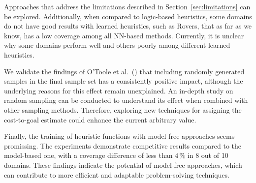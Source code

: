 Approaches that address the limitations described in Section~\ref{sec:limitations} can be explored. Additionally, when compared to logic-based heuristics, some domains do not have good results with learned heuristics, such as Rovers, that as far as we know, has a low coverage among all NN-based methods. Currently, it is unclear why some domains perform well and others poorly among different learned heuristics.

We validate the findings of O'Toole et al.~(\citeyear{OToole/2022}) that including randomly generated samples in the final sample set has a consistently positive impact, although the underlying reasons for this effect remain unexplained. An in-depth study on random sampling can be conducted to understand its effect when combined with other sampling methods. Therefore, exploring new techniques for assigning the cost-to-goal estimate could enhance the current arbitrary value.

Finally, the training of heuristic functions with model-free approaches seems promissing. The experiments demonstrate competitive results compared to the model-based one, with a coverage difference of less than $4\,\%$ in 8 out of 10 domains. These findings indicate the potential of model-free approaches, which can contribute to more efficient and adaptable problem-solving techniques.
